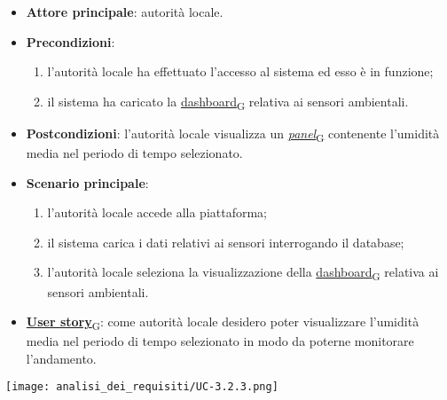 \newpage
{}
\begin{itemize}
	\item \textbf{Attore principale}: autorità locale.
	\item \textbf{Precondizioni}:
	      \begin{enumerate}
		      \item l'autorità locale ha effettuato l'accesso al sistema ed esso è in funzione;
		      \item il sistema ha caricato la \href{https://7last.github.io/docs/pb/documentazione-interna/glossario\#dashboard}{dashboard\textsubscript{G}} relativa ai sensori ambientali.
	      \end{enumerate}
	\item \textbf{Postcondizioni}: l'autorità locale visualizza un \href{https://7last.github.io/docs/pb/documentazione-interna/glossario\#panel}{\textit{panel}\textsubscript{G}} contenente l'umidità media nel periodo di tempo selezionato.
	\item \textbf{Scenario principale}:
	      \begin{enumerate}
		      \item l'autorità locale accede alla piattaforma;
		      \item il sistema carica i dati relativi ai sensori interrogando il database;
		      \item l'autorità locale seleziona la visualizzazione della \href{https://7last.github.io/docs/pb/documentazione-interna/glossario\#dashboard}{dashboard\textsubscript{G}} relativa ai sensori ambientali.
	      \end{enumerate}
	\item \href{https://7last.github.io/docs/pb/documentazione-interna/glossario\#user-story}{\textbf{User story}\textsubscript{G}}: come autorità locale desidero poter visualizzare l'umidità media nel periodo di tempo selezionato
	      in modo da poterne monitorare l'andamento.
\end{itemize}
\begin{center}
	\texttt{[image: analisi\_dei\_requisiti/UC-3.2.3.png]}
\end{center}

